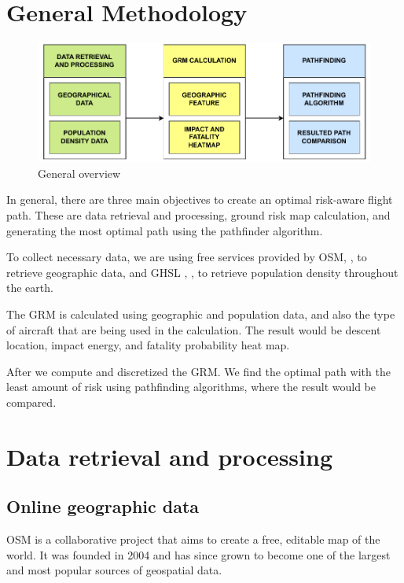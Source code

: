 \documentclass[12pt]{report}
\begin{document}
    \section{General Methodology}
        \begin{figure}[H]
            \centering
            \includegraphics[width=\textwidth]{General Image/OSM Drone-General Overview.pdf}
            \caption{General overview}
        \end{figure}

        In general, there are three main objectives to create an optimal risk-aware flight path. These are data
        retrieval and processing, ground risk map calculation, and generating the most optimal path using the pathfinder
        algorithm.

        To collect necessary data, we are using free services provided by \ac{OSM},
        \cite{openstreetmap_contributors_planet_2017}, to retrieve geographic data, and \ac{GHSL} ,
        \cite{commission_ghsl_2023}, to retrieve population density throughout the earth.

        The \ac{GRM} is calculated using geographic and population data, and also the type of aircraft that are being
        used in the calculation. The result would be descent location, impact energy, and fatality probability heat map. 
        
        After we compute and discretized the GRM. We find the optimal path with the least amount of risk using
        pathfinding algorithms, where the result would be compared.

    \section{Data retrieval and processing}
        \subsection{Online geographic data}
        OSM is a collaborative project that aims to create a free, editable map of the world. It was founded in 2004 and
        has since grown to become one of the largest and most popular sources of geospatial data.
            
\end{document}

